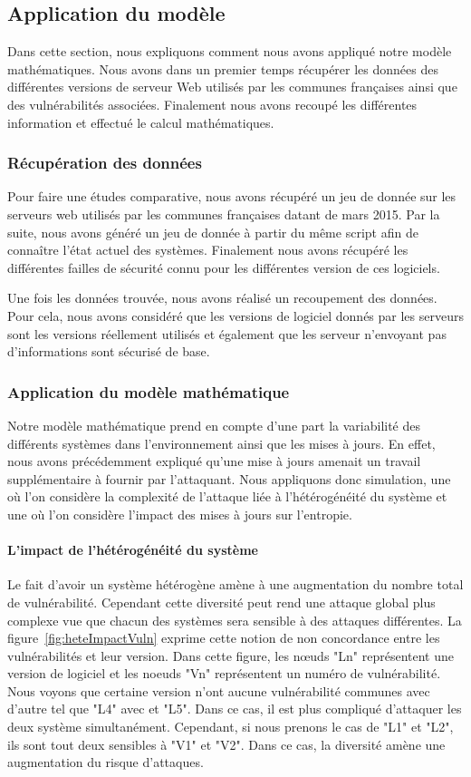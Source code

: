 \subsection{Application du modèle}
Dans cette section, nous expliquons comment nous avons appliqué notre modèle mathématiques.
Nous avons dans un premier temps récupérer les données des différentes versions de serveur Web utilisés par les communes françaises ainsi que des vulnérabilités associées.
Finalement nous avons recoupé les différentes information et effectué le calcul mathématiques.

\subsubsection{Récupération des données}
Pour faire une études comparative, nous avons récupéré un jeu de donnée sur les serveurs web utilisés par les communes françaises datant de mars 2015.
Par la suite, nous avons généré un jeu de donnée à partir du même script afin de connaître l'état actuel des systèmes.
Finalement nous avons récupéré les différentes failles de sécurité connu pour les différentes version de ces logiciels.

Une fois les données trouvée, nous avons réalisé un recoupement des données.
Pour cela, nous avons considéré que les versions de logiciel donnés par les serveurs sont les versions réellement utilisés et également que les serveur n'envoyant pas d'informations sont sécurisé de base.


\subsubsection{Application du modèle mathématique}
Notre modèle mathématique prend en compte d'une part la variabilité des différents systèmes dans l'environnement ainsi que les mises à jours.
En effet, nous avons précédemment expliqué qu'une mise à jours amenait un travail supplémentaire à fournir par l'attaquant.
Nous appliquons donc simulation, une où l'on considère la complexité de l'attaque liée à l'hétérogénéité du système et une où l'on considère l'impact des mises à jours sur l'entropie.

\paragraph{L'impact de l'hétérogénéité du système}
Le fait d'avoir un système hétérogène amène à une augmentation du nombre total de vulnérabilité.
Cependant cette diversité peut rend une attaque global plus complexe vue que chacun des systèmes sera sensible à des attaques différentes.
La figure~\ref{fig:heteImpactVuln} exprime cette notion de non concordance entre les vulnérabilités et leur version.
Dans cette figure, les nœuds "Ln" représentent une version de logiciel et les noeuds "Vn" représentent un numéro de vulnérabilité.
Nous voyons que certaine version n'ont aucune vulnérabilité communes avec d'autre tel que "L4" avec et "L5".
Dans ce cas, il est plus compliqué d'attaquer les deux système simultanément.
Cependant, si nous prenons le cas de "L1" et "L2", ils sont tout deux sensibles à "V1" et "V2".
Dans ce cas, la diversité amène une augmentation du risque d'attaques.


